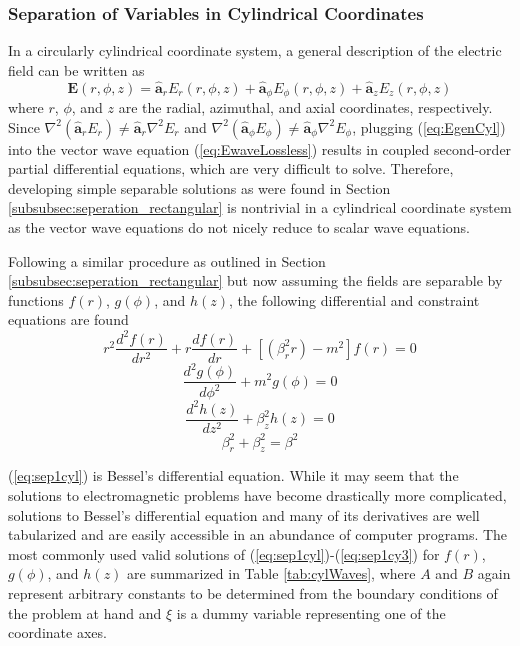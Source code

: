 \subsubsection{Separation of Variables in Cylindrical Coordinates}\label{subsubsec:seperation_cylindrical}
In a circularly cylindrical coordinate system, a general description of the electric field can be written as
\begin{equation}\label{eq:EgenCyl}
	\mathbf{E}(r,\phi,z) =  \hat{\mathbf{a}}_{r}E_r(r,\phi, z) + \hat{\mathbf{a}}_{\phi}E_\phi(r,\phi,z) + \hat{\mathbf{a}}_{z}E_z(r,\phi, z)
\end{equation}
where $r$, $\phi$, and $z$ are the radial, azimuthal, and axial coordinates, respectively. Since $\nabla^2(\hat{\mathbf{a}}_{r}E_r)  \neq \hat{\mathbf{a}}_{r}\nabla^2E_r$ and $\nabla^2(\hat{\mathbf{a}}_{\phi}E_\phi)  \neq \hat{\mathbf{a}}_{\phi}\nabla^2E_\phi$, plugging (\ref{eq:EgenCyl}) into the vector wave equation (\ref{eq:EwaveLossless}) results in coupled second-order partial differential equations, which are very difficult to solve. Therefore, developing simple separable solutions as were found in Section \ref{subsubsec:seperation_rectangular} is nontrivial in a cylindrical coordinate system as the vector wave equations do not nicely reduce to scalar wave equations.  

Following a similar procedure as outlined in Section \ref{subsubsec:seperation_rectangular} but now assuming the fields are separable by functions $f(r)$, $g(\phi)$, and $h(z)$, the following differential and constraint equations are found 
\begin{equation}\label{eq:sep1cyl}
	r^2 \frac{d^2f(r)}{dr^2} + r \frac{df(r)}{dr} + [(\beta_r^2r)-m^2]f(r) = 0
\end{equation}
\begin{equation}\label{eq:sep1cy2}
	\frac{d^2g(\phi)}{d\phi^2} + m^2g(\phi) = 0
\end{equation}
\begin{equation}\label{eq:sep1cy3}
	\frac{d^2h(z)}{dz^2} + \beta_z^2h(z) = 0
\end{equation}
\begin{equation}\label{eq:constraintCyl}
	\beta_r^2 + \beta_z^2 = \beta^2
\end{equation}

(\ref{eq:sep1cyl}) is Bessel's differential equation. While it may seem that the solutions to electromagnetic problems have become drastically more complicated, solutions to Bessel's differential equation and many of its derivatives are well tabularized and are easily accessible in an abundance of computer programs. The most commonly used valid solutions of (\ref{eq:sep1cyl})-(\ref{eq:sep1cy3}) for $f(r)$, $g(\phi)$, and $h(z)$ are summarized in Table \ref{tab:cylWaves}, where $A$ and $B$ again represent arbitrary constants to be determined from the boundary conditions of the problem at hand and $\xi$ is a dummy variable representing one of the coordinate axes.

